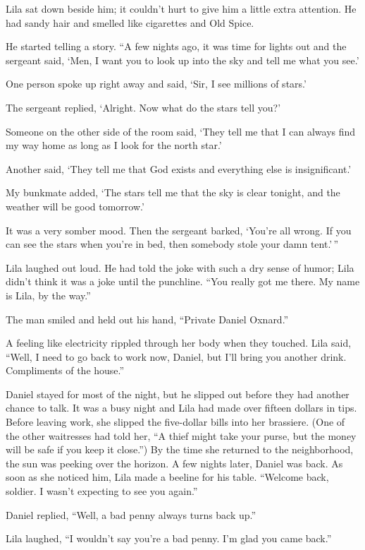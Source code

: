 \documentclass[
  letterpaper,
]{book}
\begin{document}
Lila sat down beside him; it couldn't hurt to give him a little extra
attention. He had sandy hair and smelled like cigarettes and Old Spice.

He started telling a story. ``A few nights ago, it was time for lights
out and the sergeant said, `Men, I want you to look up into the sky and
tell me what you see.'

One person spoke up right away and said, `Sir, I see millions of stars.'

The sergeant replied, `Alright. Now what do the stars tell you?'

Someone on the other side of the room said, `They tell me that I can
always find my way home as long as I look for the north star.'

Another said, `They tell me that God exists and everything else is
insignificant.'

My bunkmate added, `The stars tell me that the sky is clear tonight, and
the weather will be good tomorrow.'

It was a very somber mood. Then the sergeant barked, `You're all wrong.
If you can see the stars when you're in bed, then somebody stole your
damn tent.'\,''

Lila laughed out loud. He had told the joke with such a dry sense of
humor; Lila didn't think it was a joke until the punchline. ``You really
got me there. My name is Lila, by the way.''

The man smiled and held out his hand, ``Private Daniel Oxnard.''

A feeling like electricity rippled through her body when they touched.
Lila said, ``Well, I need to go back to work now, Daniel, but I'll bring
you another drink. Compliments of the house.''

Daniel stayed for most of the night, but he slipped out before they had
another chance to talk. It was a busy night and Lila had made over
fifteen dollars in tips. Before leaving work, she slipped the
five-dollar bills into her brassiere. (One of the other waitresses had
told her, ``A thief might take your purse, but the money will be safe if
you keep it close.'') By the time she returned to the neighborhood, the
sun was peeking over the horizon. A few nights later, Daniel was back.
As soon as she noticed him, Lila made a beeline for his table. ``Welcome
back, soldier. I wasn't expecting to see you again.''

Daniel replied, ``Well, a bad penny always turns back up.''

Lila laughed, ``I wouldn't say you're a bad penny. I'm glad you came
back.''
\end{document}
